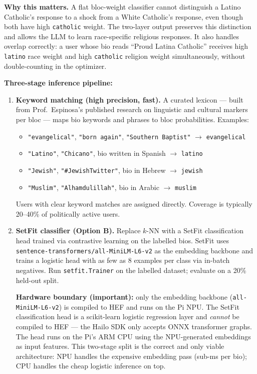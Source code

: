 \documentclass[11pt]{article}
\begin{document}
\textbf{Why this matters.} A flat bloc-weight classifier cannot distinguish a
Latino Catholic's response to a shock from a White Catholic's response, even
though both have high \texttt{catholic} weight. The two-layer output preserves
this distinction and allows the LLM to learn race-specific religious responses.
It also handles overlap correctly: a user whose bio reads ``Proud Latina Catholic''
receives high \texttt{latino} race weight and high \texttt{catholic} religion
weight simultaneously, without double-counting in the optimizer.

\textbf{Three-stage inference pipeline:}

\begin{enumerate}[leftmargin=2em, itemsep=3pt]
  \item \textbf{Keyword matching (high precision, fast).} A curated lexicon --- built
        from Prof.\ Espinosa's published research on linguistic and cultural markers
        per bloc --- maps bio keywords and phrases to bloc probabilities. Examples:
        \begin{itemize}[leftmargin=1.6em, itemsep=1pt]
          \item \texttt{"evangelical"}, \texttt{"born again"}, \texttt{"Southern Baptist"}
                $\to$ \texttt{evangelical}
          \item \texttt{"Latino"}, \texttt{"Chicano"}, bio written in Spanish
                $\to$ \texttt{latino}
          \item \texttt{"Jewish"}, \texttt{"\#JewishTwitter"}, bio in Hebrew
                $\to$ \texttt{jewish}
          \item \texttt{"Muslim"}, \texttt{"Alhamdulillah"}, bio in Arabic
                $\to$ \texttt{muslim}
        \end{itemize}
        Users with clear keyword matches are assigned directly. Coverage is typically
        20--40\% of politically active users.

  \item \textbf{SetFit classifier (Option B).} Replace $k$-NN with a SetFit
        classification head trained via contrastive learning on the labelled bios.
        SetFit uses \texttt{sentence-transformers/all-MiniLM-L6-v2} as the embedding
        backbone and trains a logistic head with as few as 8 examples per class via
        in-batch negatives. Run \texttt{setfit.Trainer} on the labelled dataset;
        evaluate on a 20\% held-out split.

        \textbf{Hardware boundary (important):} only the embedding backbone
        (\texttt{all-MiniLM-L6-v2}) is compiled to HEF and runs on the Pi NPU.
        The SetFit classification head is a scikit-learn logistic regression layer
        and \emph{cannot} be compiled to HEF --- the Hailo SDK only accepts ONNX
        transformer graphs. The head runs on the Pi's ARM CPU using the NPU-generated
        embeddings as input features. This two-stage split is the correct and only
        viable architecture: NPU handles the expensive embedding pass (sub-ms per bio);
        CPU handles the cheap logistic inference on top.


\end{enumerate}
\end{document}
